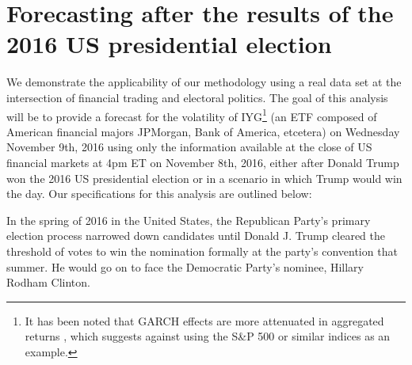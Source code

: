\documentclass{uiucthesis2021}
\theoremstyle{definition}
\begin{document}
\clearpage 

\section{Forecasting after the results of the 2016 US presidential election}\label{Real Data Example}

We demonstrate the applicability of our methodology using a real data set at the intersection of financial trading and electoral politics. The goal of this analysis will be to provide a forecast for the volatility of IYG\footnote{It has been noted that GARCH effects are more attenuated in aggregated returns \cite[][]{zivot2009practical}, which suggests against using the S\&P 500 or similar indices as an example.} (an ETF composed of American financial majors JPMorgan, Bank of America, etcetera) on Wednesday November 9th, 2016 using only the information available at the close of US financial markets at 4pm ET on November 8th, 2016, either after Donald Trump won the 2016 US presidential election or in a scenario in which Trump would win the day. Our specifications for this analysis are outlined below:

In the spring of 2016 in the United States, the Republican Party's primary election process narrowed down candidates until Donald J. Trump cleared the threshold of votes to win the nomination formally at the party's convention that summer.  He would go on to face the Democratic Party's nominee, Hillary Rodham Clinton.   

\end{document}
